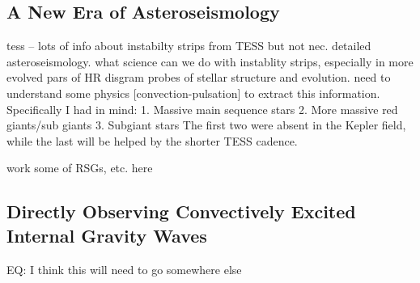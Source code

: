 {\color{blue}
\subsection{A New Era of Asteroseismology}

tess -- lots of info about instabilty strips from TESS but not nec. detailed asteroseismology.  what science can we do with instablity strips, especially in more evolved pars of HR disgram  probes of stellar structure and evolution.   need to understand some physics [convection-pulsation] to extract this information.   Specifically I had in mind: 1. Massive main sequence stars 2. More massive red giants/sub giants 3. Subgiant stars The first two were absent in the Kepler field, while the last will be helped by the shorter TESS cadence.

work some of RSGs, etc. here

\subsection{Directly Observing Convectively Excited Internal Gravity Waves}

EQ: I think this will need to go somewhere else



}